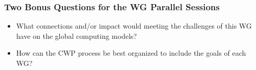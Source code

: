 \begin{frame}
\frametitle{Two Bonus Questions for the WG Parallel Sessions}

\begin{itemize}
\item What connections and/or impact would meeting the challenges of this WG have on the global computing models?
\item How can the CWP process be best organized to include the goals of each WG?
\end{itemize}

\end{frame}


